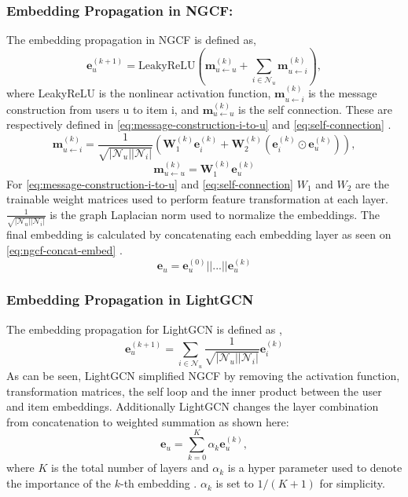\subsubsection{Embedding Propagation in NGCF:}
The embedding propagation in NGCF is defined as,
\begin{equation}
    \mathbf{e}_{u}^{(k+1)} = \mbox{LeakyReLU}(\mathbf{m}^{(k)}_{u \leftarrow u} + \sum^{}_{i \in \mathcal{N}_u} \mathbf{m}^{(k)}_{u \leftarrow i}),
    \label{eq:ngcf-embedding-propagation}
\end{equation}
where LeakyReLU is the nonlinear activation function, $\mathbf{m}^{(k)}_{u \leftarrow i}$ is the message construction from users u to item i, and $\mathbf{m}^{(k)}_{u \leftarrow u}$ is the self connection.
These are respectively defined in \autoref{eq:message-construction-i-to-u} and \autoref{eq:self-connection} \cite{NGCF_2019}.
\begin{equation}
    \mathbf{m}^{(k)}_{u \leftarrow i} = \frac{1}{\sqrt{|\mathcal{N}_u||\mathcal{N}_i|}}(\mathbf{W}^{(k)}_1\mathbf{e}^{(k)}_i + \mathbf{W}^{(k)}_2(\mathbf{e}^{(k)}_i \odot \mathbf{e}^{(k)}_u)),
    \label{eq:message-construction-i-to-u}
\end{equation}
\begin{equation}
    \mathbf{m}^{(k)}_{u \leftarrow u} = \mathbf{W}_1^{(k)}\mathbf{e}_u^{(k)}
    \label{eq:self-connection}
\end{equation}
For \autoref{eq:message-construction-i-to-u} and \autoref{eq:self-connection} $W_1$ and $W_2$ are the trainable weight matrices used to perform feature transformation at each layer.
$\frac{1}{\sqrt{|\mathcal{N}_u||\mathcal{N}_i|}}$ is the graph Laplacian norm used to normalize the embeddings.
The final embedding is calculated by concatenating each embedding layer as seen on \autoref{eq:ngcf-concat-embed} \cite{NGCF_2019}.
\begin{equation}
    \mathbf{e}_u = \mathbf{e}_u^{(0)}||...||\mathbf{e}_u^{(k)}
    \label{eq:ngcf-concat-embed}
\end{equation}

\subsubsection{Embedding Propagation in LightGCN}
The embedding propagation for LightGCN is defined as \cite{lightgcn},
\begin{equation}
    \mathbf{e}_{u}^{(k+1)} = \sum^{}_{i \in \mathcal{N}_u} \frac{1}{\sqrt{|\mathcal{N}_u||\mathcal{N}_i|}} \mathbf{e}_i^{(k)}
\end{equation}
As can be seen, LightGCN simplified NGCF by removing the activation function, transformation matrices, the self loop and the inner product between the user and item embeddings.
Additionally LightGCN changes the layer combination from concatenation to weighted summation as shown here:
\begin{equation}
    \mathbf{e}_u = \sum_{k=0}^{K} \alpha_k \mathbf{e}_u^{(k)},
    \label{eq:lightgcn-sum}
\end{equation}
where $K$ is the total number of layers and $\alpha_k$ is a hyper parameter used to denote the importance of the $k$-th embedding \cite{lightgcn}.
$\alpha_k$ is set to $1 /(K + 1)$ for simplicity.

